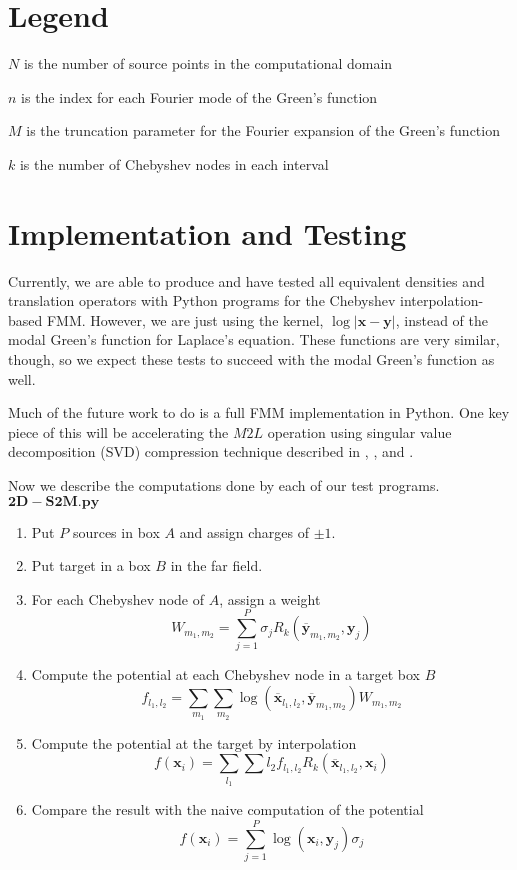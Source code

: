 \documentclass[11pt, oneside]{article}   	%
\begin{document}
\begin{appendices}
\section{Legend}
$N$ is the number of source points in the computational domain

$n$ is the index for each Fourier mode of the Green's function

$M$ is the truncation parameter for the Fourier expansion of the Green's function

$k$ is the number of Chebyshev nodes in each interval

\section{Implementation and Testing}
Currently, we are able to produce and have tested all equivalent densities and translation operators with Python programs for the Chebyshev interpolation-based FMM. However, we are just using the kernel, $\log|\mathbf{x}-\mathbf{y}|$, instead of the modal Green's function for Laplace's equation. These functions are very similar, though, so we expect these tests to succeed with the modal Green's function as well.

Much of the future work to do is a full FMM implementation in Python. One key piece of this will be accelerating the $M2L$ operation using singular value decomposition (SVD) compression technique described in \cite{CGMR}, \cite{FD}, and  \cite{MV}.

Now we describe the computations done by each of our test programs.\\
$\mathbf{2D-S2M.py}$
\begin{enumerate}
\item Put $P$ sources in box $A$ and assign charges of $\pm 1$.
\item Put target in a box $B$ in the far field.
\item For each Chebyshev node of $A$, assign a weight\\
$$W_{m_1,m_2}=\sum_{j=1}^P \sigma_j R_k(\mathbf{\overline{y}}_{m_1,m_2},\mathbf{y}_j)$$
\item Compute the potential at each Chebyshev node in a target box $B$\\
$$f_{l_1,l_2}=\sum_{m_1}\sum_{m_2} \log(\mathbf{\overline{x}}_{l_1,l_2},\mathbf{\overline{y}}_{m_1,m_2}) W_{m_1,m_2}$$
\item Compute the potential at the target by interpolation\\
$$f(\mathbf{x}_i)=\sum_{l_1}\sum{l_2} f_{l_1,l_2} R_k(\mathbf{\overline{x}}_{l_1,l_2},\mathbf{x}_i)$$
\item Compare the result with the naive computation of the potential\\
$$f(\mathbf{x}_i)=\sum_{j=1}^P \log(\mathbf{x}_i,\mathbf{y}_j) \sigma_j$$
\end{enumerate}


\end{appendices}
\end{document}
